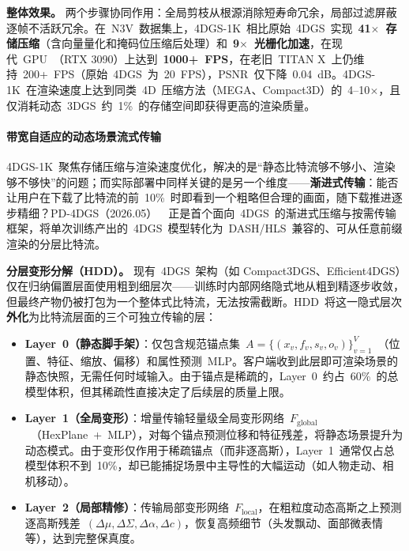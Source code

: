 \smallskip\noindent\textbf{整体效果。}
两个步骤协同作用：全局剪枝从根源消除短寿命冗余，局部过滤屏蔽逐帧不活跃冗余。在~N3V~数据集上，4DGS-1K~相比原始~4DGS~实现~\textbf{41$\times$~存储压缩}（含向量量化和掩码位压缩后处理）和~\textbf{9$\times$~光栅化加速}，在现代~GPU~（RTX 3090）上达到~\textbf{1000+~FPS}，在老旧~TITAN X~上仍维持~200+~FPS（原始~4DGS~为~20~FPS），PSNR~仅下降~0.04~dB。4DGS-1K~在渲染速度上达到同类~4D~压缩方法（MEGA、Compact3D）的~4--10$\times$，且仅消耗动态~3DGS~约~1\%~的存储空间即获得更高的渲染质量。

\paragraph{带宽自适应的动态场景流式传输}

4DGS-1K~聚焦存储压缩与渲染速度优化，解决的是``静态比特流够不够小、渲染够不够快''的问题；而实际部署中同样关键的是另一个维度——\textbf{渐进式传输}：能否让用户在下载了比特流的前~10\%~时即看到一个粗略但合理的画面，随下载推进逐步精细？PD-4DGS（2026.05）~\cite{2605_11427}~正是首个面向~4DGS~的渐进式压缩与按需传输框架，将单次训练产出的~4DGS~模型转化为~DASH/HLS~兼容的、可从任意前缀渲染的分层比特流。

\smallskip\noindent\textbf{分层变形分解（HDD）。}
现有~4DGS~架构（如 Compact3DGS、Efficient4DGS）仅在归纳偏置层面使用粗到细层次——训练时内部网络隐式地从粗到精逐步收敛，但最终产物仍被打包为一个整体式比特流，无法按需截断。HDD~将这一隐式层次\textbf{外化}为比特流层面的三个可独立传输的层：

\begin{itemize}
\item \textbf{Layer~0（静态脚手架）}：仅包含规范锚点集~$A = \{(x_v, f_v, s_v, o_v)\}_{v=1}^{V}$~（位置、特征、缩放、偏移）和属性预测~MLP。客户端收到此层即可渲染场景的静态快照，无需任何时域输入。由于锚点是稀疏的，Layer~0~约占~60\%~的总模型体积，但其稀疏性直接决定了后续层的质量上限。
\item \textbf{Layer~1（全局变形）}：增量传输轻量级全局变形网络~$F_{\mathrm{global}}$~（HexPlane~+~MLP），对每个锚点预测位移和特征残差，将静态场景提升为动态模式。由于变形仅作用于稀疏锚点（而非逐高斯），Layer~1~通常仅占总模型体积不到~10\%，却已能捕捉场景中主导性的大幅运动（如人物走动、相机移动）。
\item \textbf{Layer~2（局部精修）}：传输局部变形网络~$F_{\mathrm{local}}$，在粗粒度动态高斯之上预测逐高斯残差~$(\Delta\mu, \Delta\Sigma, \Delta\alpha, \Delta c)$，恢复高频细节（头发飘动、面部微表情等），达到完整保真度。
\end{itemize}

